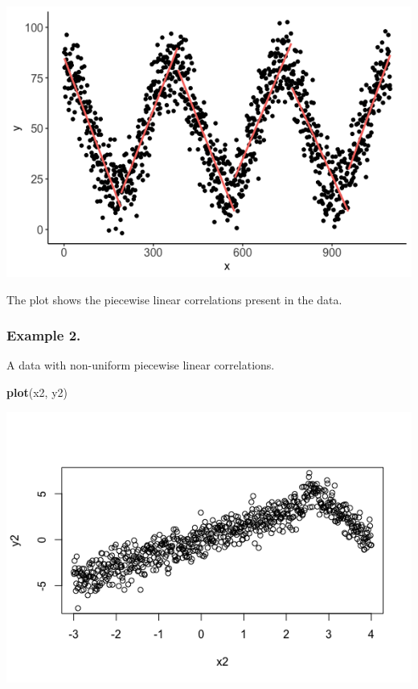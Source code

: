 \documentclass[]{article}
\newenvironment{Shaded}{\begin{snugshade}}{\end{snugshade}}
\newcommand{\KeywordTok}[1]{\textcolor[rgb]{0.13,0.29,0.53}{\textbf{#1}}}
\newcommand{\NormalTok}[1]{#1}
\begin{document}
\begin{center}\includegraphics{README_files/figure-markdown_strict/Figure-1.2-1} \end{center}

The plot shows the piecewise linear correlations present in the data.

\hypertarget{example-2.}{%
\subsubsection{Example 2.}\label{example-2.}}

A data with non-uniform piecewise linear correlations.

\begin{Shaded}
\begin{Highlighting}[]
\KeywordTok{plot}\NormalTok{(x2, y2)}
\end{Highlighting}
\end{Shaded}

\begin{center}\includegraphics{README_files/figure-markdown_strict/Figure-2.1-1} \end{center}
\end{document}
